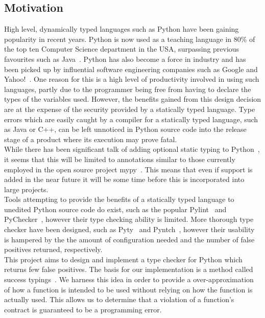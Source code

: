 \documentclass[12pt, titlepage]{article}
\begin{document}
\subsection{Motivation}
High level, dynamically typed languages such as Python have been gaining popularity in recent years. Python is now used as a teaching language in 80\% of the top ten Computer Science department in the USA, surpassing previous favourites such as Java~\cite{guoTeaching}. Python has also become a force in industry and has been picked up by influential software engineering companies such as Google and Yahoo!~\cite{organisationsPython}. One reason for this is a high level of productivity involved in using such languages, partly due to the programmer being free from having to declare the types of the variables used. However, the benefits gained from this design decision are at the expense of the security provided by a statically typed language. Type errors which are easily caught by a compiler for a statically typed language, such as Java or C++, can be left unnoticed in Python source code into the release stage of a product where its execution may prove fatal. \\ %
\indent While there has been significant talk of adding optional static typing to Python~\cite{guido1, guido2, guido3, guidoLatest}, it seems that this will be limited to annotations similar to those currently employed in the open source project mypy~\cite{mypy}. This means that even if support is added in the near future it will be some time before this is incorporated into large projects. \\
\indent Tools attempting to provide the benefits of a statically typed language to unedited Python source code do exist, such as the popular Pylint~\cite{pylint} and PyChecker~\cite{pychecker}, however their type checking ability is limited. More thorough type checker have been designed, such as Pyty~\cite{pyty} and Pyntch~\cite{pyntch}, however their usability is hampered by the the amount of configuration needed and the number of false positives returned, respectively. \\
\indent This project aims to design and implement a type checker for Python which returns few false positives. The basis for our implementation is a method called success typings~\cite{lindhal06}. We harness this idea in order to provide a over-approximation of how a function is intended to be used without relying on how the function is actually used. This allows us to determine that a violation of a function's contract is guaranteed to be a programming error. \\
\end{document}
